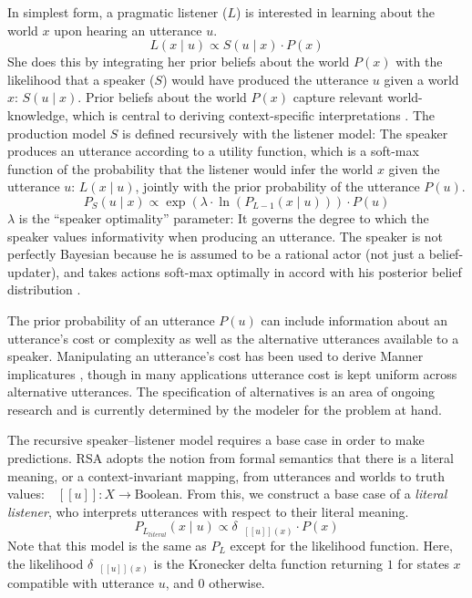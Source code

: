 \documentclass[12pt,letterpaper]{article}
\newcommand{\denote}[1]{\mbox{ $[\![ #1 ]\!]$}}
\begin{document}
In simplest form, a pragmatic listener ($L$) is interested in learning about the world $x$ upon hearing an utterance $u$. 
$$
L(x  \mid u) \propto S(u \mid x) \cdot P(x) \label{eq:RSA_L}
$$
She does this by integrating her prior beliefs about the world $P(x)$ with the likelihood that a speaker ($S$) would have produced the utterance $u$ given a world $x$: $S(u \mid x)$.
Prior beliefs about the world $P(x)$ capture relevant world-knowledge, which is central to deriving context-specific interpretations \cite{Degen2015cogsci}.
The production model $S$ is defined recursively with the listener model: The speaker produces an utterance according to a utility function, which is a soft-max function of the probability that the listener would infer the world $x$ given the utterance $u$: $L(x  \mid u)$, jointly with the prior probability of the utterance $P(u)$.
$$
P_{S}(u \mid x) \propto \exp{(\lambda \cdot \ln (P_{L-1}(x  \mid u) ) )} \cdot P(u) \label{eq:RSA_S}
$$
$\lambda$ is the ``speaker optimality'' parameter: It governs the degree to which the speaker values informativity when producing an utterance. The speaker is not perfectly Bayesian because he is assumed to be a rational actor (not just a belief-updater), and takes actions soft-max optimally in accord with his posterior belief distribution \cite{Baker2009}.

The prior probability of an utterance $P(u)$ can include information about an utterance's cost or complexity as well as the alternative utterances available to a speaker. 
Manipulating an utterance's cost has been used to derive Manner implicatures \cite{Bergen2016}, though in many applications utterance cost is kept uniform across alternative utterances. 
The specification of alternatives is an area of ongoing research \cite{Franke2014cogsci, Peloquin2016} and is currently determined by the modeler for the problem at hand.

The recursive speaker--listener model requires a base case in order to make predictions. 
RSA adopts the notion from formal semantics that there is a literal meaning, or a context-invariant mapping, from utterances and worlds to truth values:  $\denote{u}: X \rightarrow \text{Boolean}$. 
From this, we construct a base case of a \emph{literal listener}, who interprets utterances with respect to their literal meaning.
%
$$
P_{L_{literal}}(x \mid u ) \propto {\delta_{\denote{u}(x)} \cdot P(x)} \label{eq:RSA_L0}
$$
Note that this model is the same as $P_L$ except for the likelihood function. 
%
Here, the likelihood $\delta_{\denote{u}(x)}$ is the Kronecker delta function returning $1$ for states $x$ compatible with utterance $u$, and $0$ otherwise.
\end{document}
